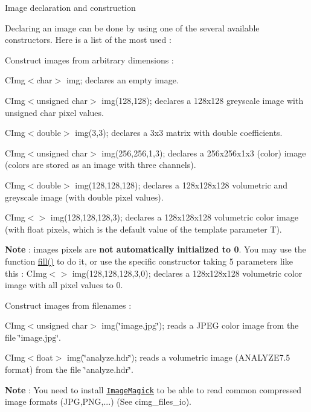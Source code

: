 \begin{DoxyParagraph}{Image declaration and construction}

\end{DoxyParagraph}
Declaring an image can be done by using one of the several available constructors. Here is a list of the most used :


\begin{DoxyItemize}
\item Construct images from arbitrary dimensions :
\begin{DoxyItemize}
\item {\ttfamily CImg$<$char$>$ img;} declares an empty image.
\item {\ttfamily CImg$<$unsigned char$>$ img(128,128);} declares a 128x128 greyscale image with {\ttfamily unsigned} {\ttfamily char} pixel values.
\item {\ttfamily CImg$<$double$>$ img(3,3);} declares a 3x3 matrix with {\ttfamily double} coefficients.
\item {\ttfamily CImg$<$unsigned char$>$ img(256,256,1,3);} declares a 256x256x1x3 (color) image (colors are stored as an image with three channels).
\item {\ttfamily CImg$<$double$>$ img(128,128,128);} declares a 128x128x128 volumetric and greyscale image (with {\ttfamily double} pixel values).
\item {\ttfamily CImg$<$$>$ img(128,128,128,3);} declares a 128x128x128 volumetric color image (with {\ttfamily float} pixels, which is the default value of the template parameter {\ttfamily T}).
\item {\bfseries Note} : images pixels are {\bfseries not automatically initialized to 0}. You may use the function \hyperlink{structcimg__library_1_1_c_img_a22c7685eaf6d61e3e25186f702cc89d0}{fill()} to do it, or use the specific constructor taking 5 parameters like this : {\ttfamily CImg$<$$>$ img(128,128,128,3,0);} declares a 128x128x128 volumetric color image with all pixel values to 0.
\end{DoxyItemize}
\end{DoxyItemize}


\begin{DoxyItemize}
\item Construct images from filenames :
\begin{DoxyItemize}
\item {\ttfamily CImg$<$unsigned char$>$ img(\char`\"{}image.jpg\char`\"{});} reads a JPEG color image from the file \char`\"{}image.jpg\char`\"{}.
\item {\ttfamily CImg$<$float$>$ img(\char`\"{}analyze.hdr\char`\"{});} reads a volumetric image (ANALYZE7.5 format) from the file \char`\"{}analyze.hdr\char`\"{}.
\item {\bfseries Note} : You need to install \href{http://www.imagemagick.org}{\tt ImageMagick} to be able to read common compressed image formats (JPG,PNG,...) (See cimg\_\-files\_\-io).
\end{DoxyItemize}
\end{DoxyItemize}



